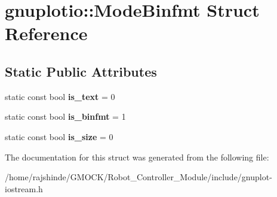 \hypertarget{structgnuplotio_1_1_mode_binfmt}{}\section{gnuplotio\+:\+:Mode\+Binfmt Struct Reference}
\label{structgnuplotio_1_1_mode_binfmt}
\subsection*{Static Public Attributes}
\begin{DoxyCompactItemize}
\item 
static const bool {\bfseries is\+\_\+text} = 0\hypertarget{structgnuplotio_1_1_mode_binfmt_a7ab187fe922cac23b0d39ade81e5eb56}{}\label{structgnuplotio_1_1_mode_binfmt_a7ab187fe922cac23b0d39ade81e5eb56}

\item 
static const bool {\bfseries is\+\_\+binfmt} = 1\hypertarget{structgnuplotio_1_1_mode_binfmt_ab0d5d3718364cdea0347f93ec121d841}{}\label{structgnuplotio_1_1_mode_binfmt_ab0d5d3718364cdea0347f93ec121d841}

\item 
static const bool {\bfseries is\+\_\+size} = 0\hypertarget{structgnuplotio_1_1_mode_binfmt_a40a5a8ee815d6a5e9a3c30c8290a6967}{}\label{structgnuplotio_1_1_mode_binfmt_a40a5a8ee815d6a5e9a3c30c8290a6967}

\end{DoxyCompactItemize}


The documentation for this struct was generated from the following file\+:\begin{DoxyCompactItemize}
\item 
/home/rajshinde/\+G\+M\+O\+C\+K/\+Robot\+\_\+\+Controller\+\_\+\+Module/include/gnuplot-\/iostream.\+h\end{DoxyCompactItemize}
